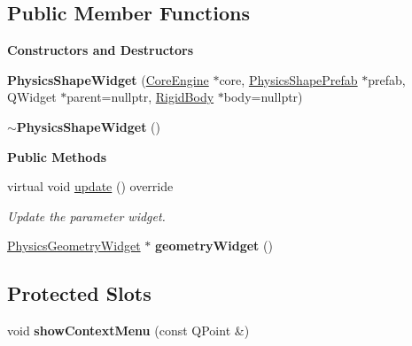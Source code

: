 \subsection*{Public Member Functions}
\begin{Indent}\textbf{ Constructors and Destructors}\par
\begin{DoxyCompactItemize}
\item 
\mbox{\label{classrev_1_1_view_1_1_physics_shape_widget_a9bfed7480aa45c2e67077bd1eb062ed0}} 
{\bfseries Physics\+Shape\+Widget} (\mbox{\hyperlink{classrev_1_1_core_engine}{Core\+Engine}} $\ast$core, \mbox{\hyperlink{classrev_1_1_physics_shape_prefab}{Physics\+Shape\+Prefab}} $\ast$prefab, Q\+Widget $\ast$parent=nullptr, \mbox{\hyperlink{classrev_1_1_rigid_body}{Rigid\+Body}} $\ast$body=nullptr)
\item 
\mbox{\label{classrev_1_1_view_1_1_physics_shape_widget_a49687797bb3ebb4d55b5a833ac9c61ab}} 
{\bfseries $\sim$\+Physics\+Shape\+Widget} ()
\end{DoxyCompactItemize}
\end{Indent}
\begin{Indent}\textbf{ Public Methods}\par
\begin{DoxyCompactItemize}
\item 
\mbox{\label{classrev_1_1_view_1_1_physics_shape_widget_ae4a7dd504f79413589ed90e947b5e13e}} 
virtual void \mbox{\hyperlink{classrev_1_1_view_1_1_physics_shape_widget_ae4a7dd504f79413589ed90e947b5e13e}{update}} () override
\begin{DoxyCompactList}\small\item\em Update the parameter widget. \end{DoxyCompactList}\item 
\mbox{\label{classrev_1_1_view_1_1_physics_shape_widget_adeee1c25c16591753e98a09210fcf792}} 
\mbox{\hyperlink{classrev_1_1_view_1_1_physics_geometry_widget}{Physics\+Geometry\+Widget}} $\ast$ {\bfseries geometry\+Widget} ()
\end{DoxyCompactItemize}
\end{Indent}
\subsection*{Protected Slots}
\begin{DoxyCompactItemize}
\item 
\mbox{\label{classrev_1_1_view_1_1_physics_shape_widget_a83d7e99279e5810ca03c74905ff8cd3b}} 
void {\bfseries show\+Context\+Menu} (const Q\+Point \&)
\end{DoxyCompactItemize}
